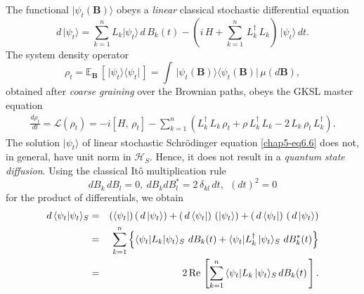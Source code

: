 The functional $\vert\psi_t(\mathbf{B})\rangle$ obeys a {\em linear} classical stochastic differential equation 
\begin{equation}
d\, \vert\psi_t\rangle=  \sum_{k=1}^n L_k \vert\psi_t\rangle\, d\,B_k(t)-( i\, H + \sum_{k=1}^n\, L^\dag_k\, L_k)\, \vert\psi_t\rangle\, dt. \label{chap5-eq6.6}
\end{equation}      
The system density operator 
\begin{equation}
\rho_t=\mathbb{E}_\mathbf{B}\,[\,\vert\psi_t\rangle\langle \psi_t\vert\,]=\int\, 
\vert\psi_t(\mathbf{B})\rangle\langle\psi_t(\mathbf{B})\vert\, \mu(d\mathbf{B}), \label{chap5-eq6.7}
\end{equation}
obtained after {\em coarse graining} over the Brownian paths,  obeys the  GKSL master equation 
\begin{eqnarray}
\frac{d \rho_t}{dt} =\mathcal{L}(\rho_t)= -i [H,\, \rho_t]- \sum_{k=1}^{n}\left(L^\dag_k\, L_k\, \rho_t + \rho\, L^\dag_k\, L_k - 2\, L_k\, \rho_t\, L^\dag_k\right). \label{chap5-eq6.8}
\end{eqnarray}
The solution $\vert\psi_t\rangle$ of linear stochastic Schr{\"o}dinger equation \eqref{chap5-eq6.6} does not, in general, have unit norm in $\mathcal{H}_S$. Hence, it  does not result in  a {\em quantum state diffusion}. Using the classical It{\^o} multiplication rule~\cite{key38}
\begin{equation}
dB_k\,dB_l=0, \ dB_k dB^*_l=2\,\delta_{kl}\, dt,\ \ (dt)^2=0 \label{chap5-eq6.9}
\end{equation} 
for the product of differentials, we obtain 
\begin{eqnarray} 
d\, \langle \psi_t\vert \psi_t\rangle_S &=&  (\langle \psi_t\vert) 
\left(\, d\, \vert\psi_t\rangle\right) + \left(\,d\, \langle \psi_t\vert\right)\,  (\vert \psi_t\rangle)
+ \left(\,d\, \langle \psi_t\vert\right)\, \left(\,d\, \vert \psi_t\rangle\right)  \nonumber \\ 
&=& \sum_{k=1}^{n}\left\{\langle \psi_t\vert L_k\vert\psi_t\rangle_S\,\, dB_k(t) + 
\langle \psi_t\vert L_k^\dag\,\vert\psi_t\rangle_S\ dB_k^*(t)\right\} \nonumber \\ 
&=& 2\, {\rm Re}\, \left[\sum_{k=1}^n\,\langle \psi_t\vert L_k\,\vert\psi_t\rangle_S\, dB_k(t)\,\right]. \label{chap5-eq6.10}
\end{eqnarray}   

